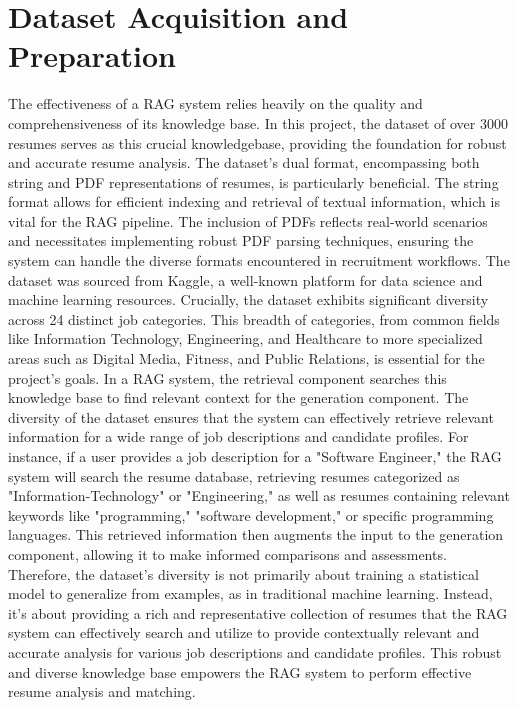 \documentclass[12pt]{report}
\begin{document}
\section{Dataset Acquisition and Preparation}
The effectiveness of a RAG system relies heavily on the quality and comprehensiveness of its knowledge base. In this project, the dataset of over 3000 resumes serves as this crucial knowledgebase, providing the foundation for robust and accurate resume analysis.
The dataset's dual format, encompassing both string and PDF representations of resumes, is particularly beneficial. The string format allows for efficient indexing and retrieval of textual information, which is vital for the RAG pipeline. The inclusion of PDFs reflects real-world scenarios and necessitates implementing robust PDF parsing techniques, ensuring the system can handle the diverse formats encountered in recruitment workflows.
The dataset was sourced from Kaggle, a well-known platform for data science and machine learning resources. Crucially, the dataset exhibits significant diversity across 24 distinct job categories. This breadth of categories, from common fields like Information Technology, Engineering, and Healthcare to more specialized areas such as Digital Media, Fitness, and Public Relations, is essential for the project's goals. In a RAG system, the retrieval component searches this knowledge base to find relevant context for the generation component. The diversity of the dataset ensures that the system can effectively retrieve relevant information for a wide range of job descriptions and candidate profiles.
For instance, if a user provides a job description for a "Software Engineer," the RAG system will search the resume database, retrieving resumes categorized as "Information-Technology" or "Engineering," as well as resumes containing relevant keywords like "programming," "software development," or specific programming languages. This retrieved information then augments the input to the generation component, allowing it to make informed comparisons and assessments.
Therefore, the dataset's diversity is not primarily about training a statistical model to generalize from examples, as in traditional machine learning. Instead, it's about providing a rich and representative collection of resumes that the RAG system can effectively search and utilize to provide contextually relevant and accurate analysis for various job descriptions and candidate profiles. This robust and diverse knowledge base empowers the RAG system to perform effective resume analysis and matching. \cite{silva-2024}
\end{document}
